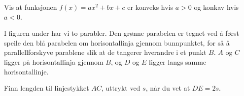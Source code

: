 Vis at funksjonen $ {f(x)=a x^2+b x + c}  $ er konveks hvis $ {a>0} $ og konkav hvis $ {a<0} $.

I figuren under har vi to parabler. Den grønne parabelen er tegnet ved å først speile den blå parabelen om horisontallinja gjennom bunnpunktet, for så å parallellforskyve parablene slik at de tangerer hverandre i et punkt $ B $. $ A $ og $ C $ ligger på horisontallinja gjennom $ B $, og $ D $ og $ E $ ligger langs samme horisontallinje.\os

Finn lengden til linjestykket $ AC $, uttrykt ved $ s $, når du vet at $ DE=2s $.
